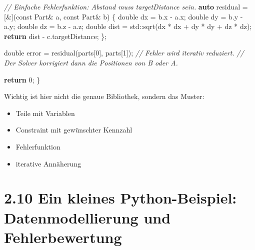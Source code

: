 \documentclass[
  12pt
]{book}
\newenvironment{Shaded}{}{}
\newcommand{\AttributeTok}[1]{\textcolor[rgb]{0.49,0.56,0.16}{#1}}
\newcommand{\BuiltInTok}[1]{\textcolor[rgb]{0.00,0.50,0.00}{#1}}
\newcommand{\CommentTok}[1]{\textcolor[rgb]{0.38,0.63,0.69}{\textit{#1}}}
\newcommand{\ControlFlowTok}[1]{\textcolor[rgb]{0.00,0.44,0.13}{\textbf{#1}}}
\newcommand{\DataTypeTok}[1]{\textcolor[rgb]{0.56,0.13,0.00}{#1}}
\newcommand{\DecValTok}[1]{\textcolor[rgb]{0.25,0.63,0.44}{#1}}
\newcommand{\KeywordTok}[1]{\textcolor[rgb]{0.00,0.44,0.13}{\textbf{#1}}}
\newcommand{\NormalTok}[1]{#1}
\newcommand{\OperatorTok}[1]{\textcolor[rgb]{0.40,0.40,0.40}{#1}}
\providecommand{\tightlist}{%
  \setlength{\itemsep}{0pt}\setlength{\parskip}{0pt}}
\begin{document}
\begin{Shaded}
\begin{Highlighting}[]
    \CommentTok{// Einfache Fehlerfunktion: Abstand muss targetDistance sein.}
    \KeywordTok{auto}\NormalTok{ residual }\OperatorTok{=} \OperatorTok{[\&](}\AttributeTok{const}\NormalTok{ Part}\OperatorTok{\&}\NormalTok{ a}\OperatorTok{,} \AttributeTok{const}\NormalTok{ Part}\OperatorTok{\&}\NormalTok{ b}\OperatorTok{)} \OperatorTok{\{}
        \DataTypeTok{double}\NormalTok{ dx }\OperatorTok{=}\NormalTok{ b}\OperatorTok{.}\NormalTok{x }\OperatorTok{{-}}\NormalTok{ a}\OperatorTok{.}\NormalTok{x}\OperatorTok{;}
        \DataTypeTok{double}\NormalTok{ dy }\OperatorTok{=}\NormalTok{ b}\OperatorTok{.}\NormalTok{y }\OperatorTok{{-}}\NormalTok{ a}\OperatorTok{.}\NormalTok{y}\OperatorTok{;}
        \DataTypeTok{double}\NormalTok{ dz }\OperatorTok{=}\NormalTok{ b}\OperatorTok{.}\NormalTok{z }\OperatorTok{{-}}\NormalTok{ a}\OperatorTok{.}\NormalTok{z}\OperatorTok{;}
        \DataTypeTok{double}\NormalTok{ dist }\OperatorTok{=} \BuiltInTok{std::}\NormalTok{sqrt}\OperatorTok{(}\NormalTok{dx }\OperatorTok{*}\NormalTok{ dx }\OperatorTok{+}\NormalTok{ dy }\OperatorTok{*}\NormalTok{ dy }\OperatorTok{+}\NormalTok{ dz }\OperatorTok{*}\NormalTok{ dz}\OperatorTok{);}
        \ControlFlowTok{return}\NormalTok{ dist }\OperatorTok{{-}}\NormalTok{ c}\OperatorTok{.}\NormalTok{targetDistance}\OperatorTok{;}
    \OperatorTok{\};}

    \DataTypeTok{double}\NormalTok{ error }\OperatorTok{=}\NormalTok{ residual}\OperatorTok{(}\NormalTok{parts}\OperatorTok{[}\DecValTok{0}\OperatorTok{],}\NormalTok{ parts}\OperatorTok{[}\DecValTok{1}\OperatorTok{]);}
    \CommentTok{// Fehler wird iterativ reduziert.}
    \CommentTok{// Der Solver korrigiert dann die Positionen von B oder A.}

    \ControlFlowTok{return} \DecValTok{0}\OperatorTok{;}
\OperatorTok{\}}
\end{Highlighting}
\end{Shaded}

Wichtig ist hier nicht die genaue Bibliothek, sondern das Muster:

\begin{itemize}
\tightlist
\item
  Teile mit Variablen
\item
  Constraint mit gewünschter Kennzahl
\item
  Fehlerfunktion
\item
  iterative Annäherung
\end{itemize}

\hypertarget{ein-kleines-python-beispiel-datenmodellierung-und-fehlerbewertung}{%
\section{\texorpdfstring{{2.10} Ein kleines Python-Beispiel:
Datenmodellierung und
Fehlerbewertung}{2.10 Ein kleines Python-Beispiel: Datenmodellierung und Fehlerbewertung}}\label{ein-kleines-python-beispiel-datenmodellierung-und-fehlerbewertung}}
\end{document}
